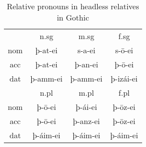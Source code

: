\begin{table}[H]
 \center
 \caption {Relative pronouns in headless relatives in Gothic}
  \begin{tabular}{cccc}
  \toprule
       & \ac{n}.\ac{sg}  & \ac{m}.\ac{sg} & \ac{f}.\ac{sg}  \\
         \cmidrule{2-4}
    \ac{nom}  & þ-at-ei      & s-a-ei      & s-ō-ei     \\
    \ac{acc} & þ-at-ei       & þ-an-ei      & þ-ō-ei      \\
    \ac{dat}  & þ-amm-ei     & þ-amm-ei    & þ-izái-ei    \\
  \bottomrule
         & \ac{n}.\ac{pl} & \ac{m}.\ac{pl} & \ac{f}.\ac{pl} \\
          \cmidrule{2-4}
    \ac{nom}  & þ-ō-ei     & þ-ái-ei     & þ-ōz-ei     \\
    \ac{acc}  & þ-ō-ei      & þ-anz-ei    & þ-ōz-ei     \\
    \ac{dat}  & þ-áim-ei    & þ-áim-ei     & þ-áim-ei     \\
    \bottomrule
  \end{tabular}
\end{table}
